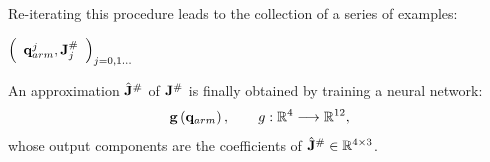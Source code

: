Re-iterating this procedure leads to the collection of a series of examples:
%
\begin{center}
\begin{math}
  \left(\begin{array}{cc}
    \mathbf q_{arm}^j , \mathbf J_j^\# \end{array}\right)_{j = 0,1\dots}
\end{math}
\end{center}
%
An approximation $\hat{\mathbf J}^\#$ of $\mathbf J^\#$ is finally
obtained by training a neural network:
%
\begin{equation}
\mathbf{g}\left(\mathbf q_{arm}\right), \qquad g : \mathbb R^4 \longrightarrow \mathbb R^{12},
\end{equation}
%
whose output components are the coefficients of 
$\hat{\mathbf J}^\# \in \mathbb R^{4 \times 3}$.


